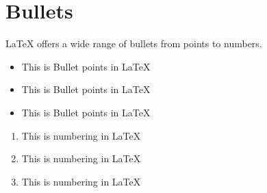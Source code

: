 \section{Bullets}
\LaTeX{} offers a wide range of bullets from points to numbers.
\begin{itemize}
    \item This is Bullet points in \LaTeX{} 
    \item This is Bullet points in \LaTeX{}
    \item This is Bullet points in \LaTeX{}
\end{itemize}

\begin{enumerate}
    \item This is numbering in \LaTeX{} 
    \item This is numbering in \LaTeX{}
    \item This is numbering in \LaTeX{}
\end{enumerate}

